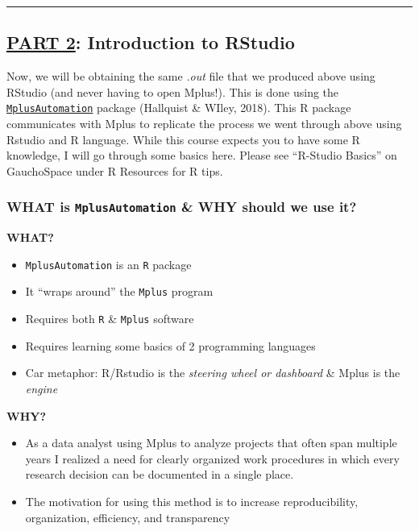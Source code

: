 \documentclass[
]{article}
\providecommand{\tightlist}{%
  \setlength{\itemsep}{0pt}\setlength{\parskip}{0pt}}
\begin{document}
\begin{center}\rule{0.5\linewidth}{0.5pt}\end{center}

\hypertarget{part-2-introduction-to-rstudio}{%
\subsection{\texorpdfstring{\underline{PART 2}: Introduction to
RStudio}{PART 2: Introduction to RStudio}}\label{part-2-introduction-to-rstudio}}

Now, we will be obtaining the same \emph{.out} file that we produced
above using RStudio (and never having to open Mplus!). This is done
using the
\href{chrome-extension://efaidnbmnnnibpcajpcglclefindmkaj/viewer.html?pdfurl=https\%3A\%2F\%2Fcran.r-project.org\%2Fweb\%2Fpackages\%2FMplusAutomation\%2FMplusAutomation.pdf\&clen=322228\&chunk=true}{\texttt{MplusAutomation}}
package (Hallquist \& WIley, 2018). This R package communicates with
Mplus to replicate the process we went through above using Rstudio and R
language. While this course expects you to have some R knowledge, I will
go through some basics here. Please see ``R-Studio Basics'' on
GauchoSpace under R Resources for R tips.

\hypertarget{what-is-mplusautomation-why-should-we-use-it}{%
\subsubsection{\texorpdfstring{WHAT is \texttt{MplusAutomation} \& WHY
should we use
it?}{WHAT is MplusAutomation \& WHY should we use it?}}\label{what-is-mplusautomation-why-should-we-use-it}}

\textbf{WHAT?}

\begin{itemize}
\tightlist
\item
  \texttt{MplusAutomation} is an \texttt{R} package
\item
  It ``wraps around'' the \texttt{Mplus} program
\item
  Requires both \texttt{R} \& \texttt{Mplus} software
\item
  Requires learning some basics of 2 programming languages
\item
  Car metaphor: R/Rstudio is the \emph{steering wheel or dashboard} \&
  Mplus is the \emph{engine}
\end{itemize}

\textbf{WHY?}

\begin{itemize}
\tightlist
\item
  As a data analyst using Mplus to analyze projects that often span
  multiple years I realized a need for clearly organized work procedures
  in which every research decision can be documented in a single place.
\item
  The motivation for using this method is to increase reproducibility,
  organization, efficiency, and transparency
\end{itemize}
\end{document}
